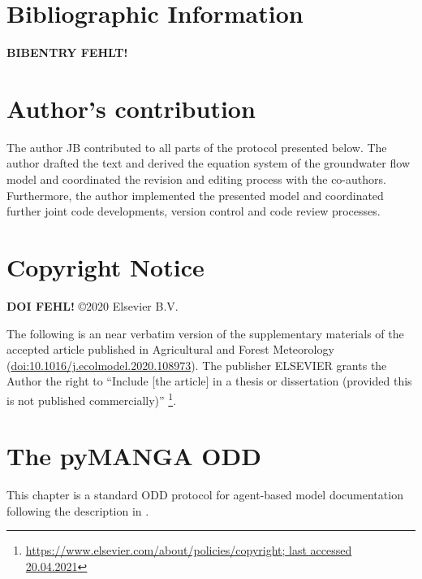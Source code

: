     \section{Bibliographic Information}
%
%
\textbf{BIBENTRY FEHLT!}
    
\section{Author's contribution}
The author JB contributed to all parts of the protocol presented below.
The author drafted the text and derived the equation system of the groundwater flow model and coordinated the revision and editing process with the co-authors. Furthermore, the author implemented the presented model and coordinated further joint code developments, version control and code review processes.
    
    \section{Copyright Notice}
    
    \textbf{DOI FEHL!}
    \copyright 2020 Elsevier B.V. 
    
    The following is an near verbatim version of the supplementary materials of the accepted article published in Agricultural and Forest Meteorology (\href{https://doi.org/10.1016/j.ecolmodel.2020.108973}{doi:10.1016/j.ecolmodel.2020.108973}). The publisher ELSEVIER grants the Author the right to ``Include [the article] in a thesis or dissertation (provided this is not published commercially)'' \footnote{\href{https://www.elsevier.com/about/policies/copyright}{https://www.elsevier.com/about/policies/copyright; last accessed 20.04.2021}}.    
    \clearpage
    


\section{The pyMANGA ODD }
This chapter is a standard ODD protocol for agent-based model documentation following the description in \citet{Grimm2020}.
